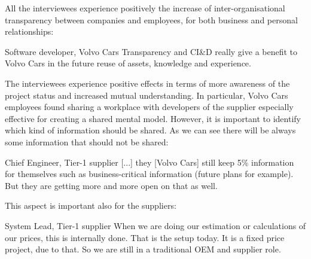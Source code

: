  All the interviewees experience positively the increase of inter-organisational transparency between companies and employees, for both business and personal relationships: 

\begin{aquote}{Software developer, Volvo Cars}
Transparency and CI\&D really give a benefit to Volvo Cars in the future reuse of assets, knowledge and experience.
\end{aquote}


The interviewees experience positive effects in terms of more awareness of the project status and increased mutual understanding. In particular, Volvo Cars employees found sharing a workplace with developers of the supplier especially effective for creating a shared mental model.  %
However, it is important to identify which kind of information should be shared. 
As we can see there will be always some information that should not be shared:

\begin{aquote}{Chief Engineer, Tier-1 supplier}
[...] they [Volvo Cars] still keep 5\% information for themselves such as business-critical information (future plans for example). But they are getting more and more open on that as well.
\end{aquote}

This aspect is important also for the suppliers:

\begin{aquote}{System Lead, Tier-1 supplier}
When we are doing our estimation or calculations of our prices, this is internally done. That is the setup today. It is a fixed price project, due to that. So we are still in a traditional OEM and supplier role.
\end{aquote}

